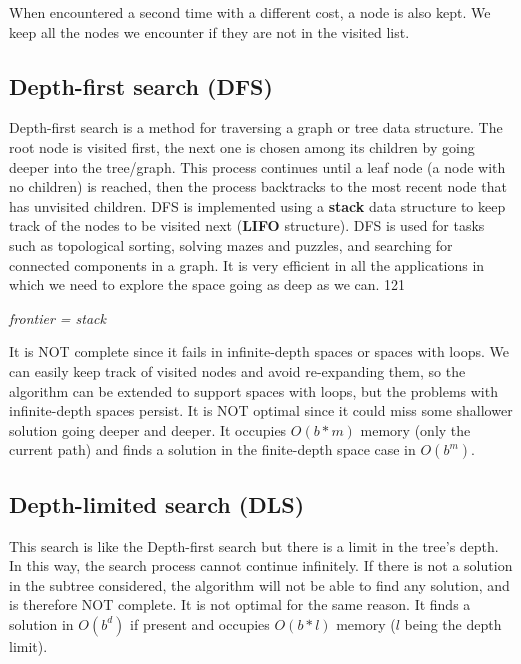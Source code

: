 \documentclass{article}
\begin{document}
When encountered a second time with a different cost, a node is also kept. We keep all the nodes we encounter if they are not in the visited list. 

\newpage

\subsection{Depth-first search (DFS)}

Depth-first search is a method for traversing a graph or tree data structure. The root node is visited first, the next one is chosen among its children by going deeper into the tree/graph. This process continues until a leaf node (a node with no children) is reached, then the process backtracks to the most recent node that has unvisited children. DFS is implemented using a \textbf{stack} data structure to keep track of the nodes to be visited next (\textbf{LIFO} structure). DFS is used for tasks such as topological sorting, solving mazes and puzzles, and searching for connected components in a graph. It is very efficient in all the applications in which we need to explore the space going as deep as we can.
121
\begin{center}
    \textit{frontier = stack}
\end{center}

It is NOT complete since it fails in infinite-depth spaces or spaces with loops. We can easily keep track of visited nodes and avoid re-expanding them, so the algorithm can be extended to support spaces with loops, but the problems with infinite-depth spaces persist. It is NOT optimal since it could miss some shallower solution going deeper and deeper. It occupies $O(b * m)$ memory (only the current path) and finds a solution in the finite-depth space case in $O(b^m)$. 

\newpage

\subsection{Depth-limited search (DLS)}

This search is like the Depth-first search but there is a limit in the tree's depth. In this way, the search process cannot continue infinitely. If there is not a solution in the subtree considered, the algorithm will not be able to find any solution, and is therefore NOT complete. It is not optimal for the same reason. It finds a solution in $O(b^d)$ if present and occupies $O(b*l)$ memory ($l$ being the depth limit).
\end{document}
